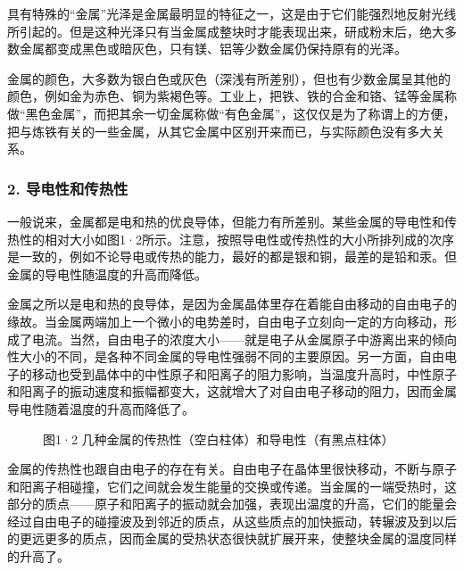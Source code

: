 具有特殊的``金属''光泽是金属最明显的特征之一，这是由于它们能强烈地反射光线所引起的。但是这种光泽只有当金属成整块时才能表现出来，研成粉末后，绝大多数金属都变成黑色或暗灰色，只有镁、铝等少数金属仍保持原有的光泽。

金属的颜色，大多数为银白色或灰色（深浅有所差别），但也有少数金属呈其他的颜色，例如金为赤色、铜为紫褐色等。工业上，把铁、铁的合金和铬、锰等金属称做``黑色金属''，而把其余一切金属称做``有色金属''，这仅仅是为了称谓上的方便，把与炼铁有关的一些金属，从其它金属中区别开来而已，与实际颜色没有多大关系。

\subsubsection{2. 导电性和传热性}

一般说来，金属都是电和热的优良导体，但能力有所差别。某些金属的导电性和传热性的相对大小如图1·2所示。注意，按照导电性或传热性的大小所排列成的次序是一致的，例如不论导电或传热的能力，最好的都是银和铜，最差的是铅和汞。但金属的导电性随温度的升高而降低。

金属之所以是电和热的良导体，是因为金属晶体里存在着能自由移动的自由电子的缘故。当金属两端加上一个微小的电势差时，自由电子立刻向一定的方向移动，形成了电流。当然，自由电子的浓度大小------就是电子从金属原子中游离出来的倾向性大小的不同，是各种不同金属的导电性强弱不同的主要原因。另一方面，自由电子的移动也受到晶体中的中性原子和阳离子的阻力影响，当温度升高时，中性原子和阳离子的振动速度和振幅都变大，这就增大了对自由电子移动的阻力，因而金属导电性随着温度的升高而降低了。

\begin{figure}
\centering
\caption{图1·2 几种金属的传热性（空白柱体）和导电性（有黑点柱体）}
\end{figure}

金属的传热性也跟自由电子的存在有关。自由电子在晶体里很快移动，不断与原子和阳离子相碰撞，它们之间就会发生能量的交换或传递。当金属的一端受热时，这部分的质点------原子和阳离子的振动就会加强，表现出温度的升高，它们的能量会经过自由电子的碰撞波及到邻近的质点，从这些质点的加快振动，转辗波及到以后的更远更多的质点，因而金属的受热状态很快就扩展开来，使整块金属的温度同样的升高了。

